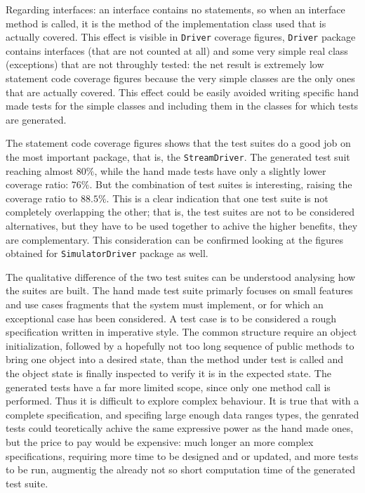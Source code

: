 \documentclass{article} \usepackage{times}
\newcommand{\lil}[1]{\texttt{\lstinline|#1|}}
\begin{document}
Regarding interfaces: an interface contains no statements, so when an
interface method is called, it is the method of the implementation
class used that is actually covered. This effect is visible in
\lil{Driver} coverage figures, \lil{Driver} package contains
interfaces (that are not counted at all) and some very simple real
class (exceptions) that are not throughly tested: the net result is
extremely low statement code coverage figures because the very simple
classes are the only ones that are actually covered. This effect could
be easily avoided writing specific hand made tests for the simple
classes and including them in the classes for which tests are
generated.

The statement code coverage figures shows that the test suites do a
good job on the most important package, that is, the
\lil{StreamDriver}. The generated test suit reaching almost $ 80 \% $,
while the hand made tests have only a slightly lower coverage ratio: $
76 \% $. But the combination of test suites is interesting,
raising the coverage ratio to $ 88.5 \% $. This is a clear indication
that one test suite is not completely overlapping the other; that is,
the test suites are not to be considered alternatives, but they have
to be used together to achive the higher benefits, they are
complementary. This consideration can be confirmed looking at the
figures obtained for \lil{SimulatorDriver} package as well.

The qualitative difference of the two test suites can be understood
analysing how the suites are built. The hand made test suite primarly
focuses on small features and use cases fragments that the system must
implement, or for which an exceptional case has been considered. A
test case is to be considered a rough specification written in
imperative style. The common structure require an object
initialization, followed by a hopefully not too long sequence of
public methods to bring one object into a desired state, than the
method under test is called and the object state is finally inspected
to verify it is in the expected state. The generated tests have a far
more limited scope, since only one method call is performed. Thus it
is difficult to explore complex behaviour. It is true that with a
complete specification, and specifing large enough data ranges types,
the genrated tests could teoretically achive the same expressive power
as the hand made ones, but the price to pay would be expensive: much
longer an more complex specifications, requiring more time to be
designed and or updated, and more tests to be run, augmentig the
already not so short computation time of the generated test suite.
\end{document}
